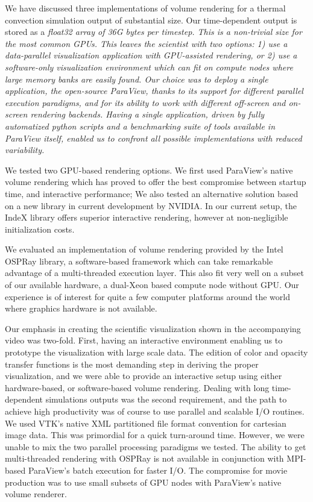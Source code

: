 \documentclass[final,5p,times,twocolumn]{elsarticle}
\begin{document}
We have discussed three implementations of volume rendering for a thermal convection
simulation output of substantial size. Our time-dependent output is stored as a
\it{float32} \rm array of 36G bytes per timestep. This is a non-trivial size for the most common
GPUs. This leaves the scientist with two options: 1) use a data-parallel visualization
application with GPU-assisted rendering, or 2) use a \it{software-only} \rm
visualization environment which can fit on compute nodes where large memory
banks are easily found. Our choice was to deploy a single application, the open-source
ParaView, thanks to its support for different parallel execution paradigms, and for its ability to work with different off-screen and on-screen rendering backends. Having a single application,
driven by fully automatized python scripts and a benchmarking suite of tools
available in ParaView itself, enabled us to confront all possible implementations with reduced variability.

We tested two GPU-based rendering options. We first used ParaView's native volume rendering which has proved to offer the best compromise between startup time, and interactive performance; We also tested an alternative solution based on a new library in current development by NVIDIA. In our current setup, the IndeX library offers superior interactive rendering, however at non-negligible initialization costs.

We evaluated an implementation of volume rendering provided by the Intel OSPRay library,
a software-based framework which can take remarkable advantage of a multi-threaded
execution layer. This also fit very well on a subset of our available hardware, a dual-Xeon based compute node without GPU. Our experience is of interest for quite a few computer platforms around the world where graphics hardware is not available. 

Our emphasis in creating the scientific visualization shown in the accompanying video was two-fold. 
First, having an interactive environment enabling us to prototype the visualization with large scale data. The edition of color and opacity transfer functions is the most demanding step in
deriving the proper visualization, and we were able to provide an interactive setup using either hardware-based, or software-based volume rendering. Dealing with long time-dependent simulations outputs was the second requirement, and the path to achieve high productivity was of course to use parallel and scalable I/O routines. We used VTK's native XML partitioned file format convention for cartesian image data. This was primordial for a quick turn-around time. However, we were unable to mix the two parallel processing paradigms we tested. The ability to get multi-threaded rendering with OSPRay is not available in conjunction with MPI-based ParaView's batch execution for faster I/O. The compromise for movie production was to use small subsets of GPU nodes with ParaView's native volume renderer.
\end{document}
